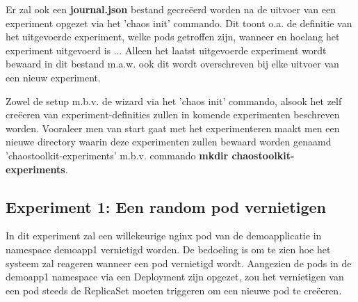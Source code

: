 Er zal ook een {\bf journal.json} bestand gecreëerd worden na de uitvoer van een experiment opgezet via het 'chaos init' commando. Dit toont o.a. de definitie van het uitgevoerde experiment, welke pods getroffen zijn, wanneer en hoelang het experiment uitgevoerd is ...
Alleen het laatst uitgevoerde experiment wordt bewaard in dit bestand m.a.w. ook dit wordt overschreven bij elke uitvoer van een nieuw experiment.   

Zowel de setup m.b.v. de wizard via het 'chaos init' commando, alsook het zelf creëeren van experiment-definities zullen in komende experimenten beschreven worden. Vooraleer men van start gaat met het experimenteren maakt men een nieuwe directory waarin deze experimenten zullen bewaard worden genaamd 'chaostoolkit-experiments' m.b.v. commando {\bf mkdir chaostoolkit-experiments}. 

\subsection{Experiment 1: Een random pod vernietigen}

In dit experiment zal een willekeurige nginx pod van de demoapplicatie in namespace demoapp1 vernietigd worden. De bedoeling is om te zien hoe het systeem zal reageren wanneer een pod vernietigd wordt. Aangezien de pods in de demoapp1 namespace via een Deployment zijn opgezet, zou het vernietigen van een pod steeds de ReplicaSet moeten triggeren om een nieuwe pod te creëeren.

